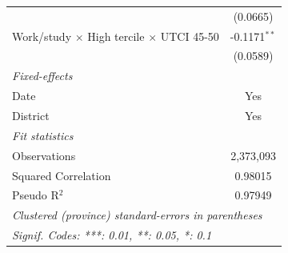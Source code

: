 \begin{table}[htbp]
\begin{tabular}{lc}
                                                                        & (0.0665)\\   
      Work/study $\times$ High tercile $\times$ UTCI 45-50              & -0.1171$^{**}$\\   
                                                                        & (0.0589)\\   
      \midrule
      \emph{Fixed-effects}\\
      Date                                                              & Yes\\  
      District                                                          & Yes\\  
      \midrule
      \emph{Fit statistics}\\
      Observations                                                      & 2,373,093\\  
      Squared Correlation                                               & 0.98015\\  
      Pseudo R$^2$                                                      & 0.97949\\  
      \midrule \midrule
      \multicolumn{2}{l}{\emph{Clustered (province) standard-errors in parentheses}}\\
      \multicolumn{2}{l}{\emph{Signif. Codes: ***: 0.01, **: 0.05, *: 0.1}}\\
   \end{tabular}
\end{table}


